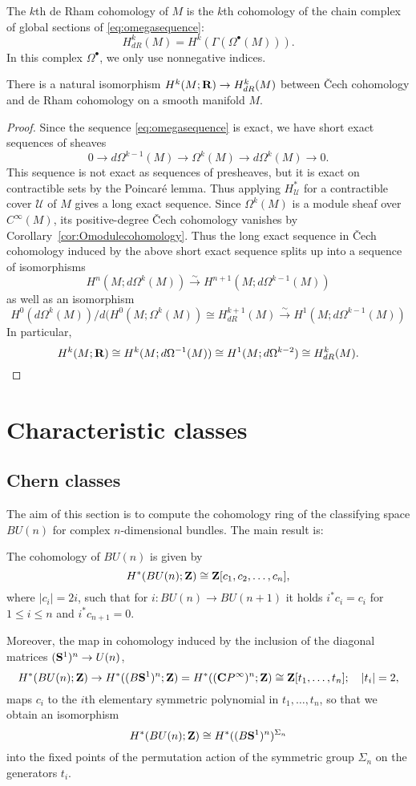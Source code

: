 \documentclass[a4paper,openany]{scrbook}
\begin{document}
\begin{defn}
The $k$th de Rham cohomology of $M$ is the $k$th cohomology of the chain complex of global sections of \eqref{eq:omegasequence}:
\[
H^k_{dR}(M) = H^k(\Gamma(\Omega^\bullet(M))).
\]
In this complex $\Omega^\bullet$, we only use nonnegative indices.
\end{defn}

\begin{thm}
There is a natural isomorphism $H^k(M;\R) \to H^k_{dR}(M)$ between \v Cech cohomology and de Rham cohomology on a smooth manifold $M$.
\end{thm}
\begin{proof}
Since the sequence \eqref{eq:omegasequence} is exact, we have short exact sequences of sheaves
\[
0 \to d\Omega^{k-1}(M) \to \Omega^k(M) \to d\Omega^k(M) \to 0.
\]
This sequence is not exact as sequences of presheaves, but it is exact on contractible sets by the Poincaré lemma. Thus applying $H^*_{\mathcal U}$ for a contractible cover $\mathcal U$ of $M$ gives a long exact sequence. Since $\Omega^k(M)$ is a module sheaf over $C^\infty(M)$, its positive-degree \v Cech cohomology vanishes by Corollary~\ref{cor:Omodulecohomology}. Thus the long exact sequence in \v Cech cohomology induced by the above short exact sequence splits up into a sequence of isomorphisms
\[
H^n(M;d\Omega^k(M)) \xrightarrow{\sim} H^{n+1}(M;d\Omega^{k-1}(M))
\]
as well as an isomorphism
\[
H^0(d\Omega^k(M))/d(H^0(M;\Omega^{k}(M)) \cong H^{k+1}_{dR}(M) \xrightarrow{\sim} H^1(M;d\Omega^{k-1}(M)) 
\]
In particular,
\[
H^k(M;\R) \cong H^k(M;d\Omega^{-1}(M)) \cong H^1(M;d\Omega^{k-2}) \cong H^k_{dR}(M).
\]
\end{proof}

\chapter{Characteristic classes}

\section{Chern classes}\label{sec:chernclasses}

The aim of this section is to compute the cohomology ring of the classifying space $BU(n)$ for complex $n$-dimensional bundles. The main result is:

\begin{thm}\label{thm:cohomologyofBU}
The cohomology of $BU(n)$ is given by
\[
H^*(BU(n);\Z) \cong \Z[c_1,c_2,\dots,c_n],
\]
where $|c_i|=2i$, such that for $i: BU(n) \to BU(n+1)$ it holds $i^* c_i  = c_i$ for $1 \leq i \leq n$ and $i^*c_{n+1} = 0$.

Moreover, the map in cohomology induced by the inclusion of the diagonal matrices $(\S^1)^n \to U(n)$,
\[
H^*(BU(n);\Z) \to H^*((B\S^1)^n;\Z) = H^*((\CC P^\infty)^n;\Z) \cong \Z[t_1,\dots,t_n]; \quad |t_i| = 2,
\]
maps $c_i$ to the $i$th elementary symmetric polynomial in $t_1,\dots,t_n$, so that we obtain an isomorphism
\[
H^*(BU(n);\Z) \cong H^*((B\S^1)^n)^{\Sigma_n}
\]
into the fixed points of the permutation action of the symmetric group $\Sigma_n$ on the generators $t_i$.
\end{thm}
\end{document}
